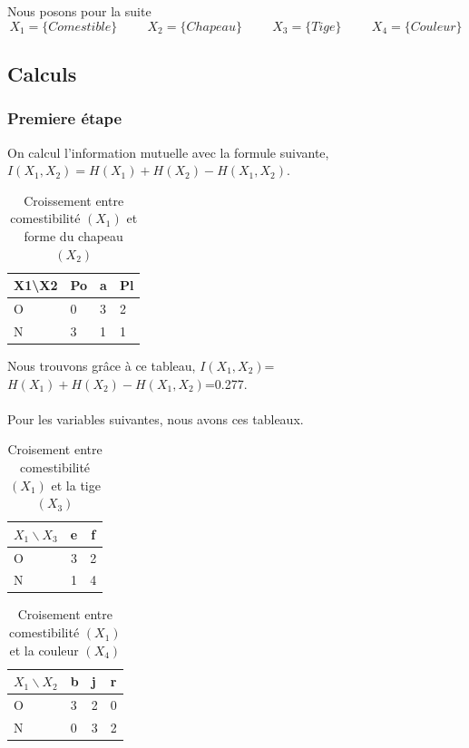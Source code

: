 \documentclass{article}
\begin{document}
Nous posons pour la suite
\[
X_1 = \{Comestible\} \hspace{1cm} X_2 = \{Chapeau\} \hspace{1cm} X_3 = \{Tige\} \hspace{1cm} X_4 = \{Couleur\}
\]

\subsection{Calculs}

\subsubsection{Premiere étape}
On calcul l'information mutuelle avec la formule suivante, $I(X_1,X_2) = H(X_1) + H(X_2) - H(X_1,X_2)$.

\begin{table}[H]
  \centering
    \caption{Croissement entre comestibilité $(X_1)$ et forme du chapeau $(X_2)$}
    \begin{tabular}{|l|l|l|l|}
    \hline
    X1\textbackslash{}X2 & Po & a & Pl \\ \hline
    O                    & 0  & 3 & 2  \\ \hline
    N                    & 3  & 1 & 1  \\ \hline
    \end{tabular}
\end{table}
Nous trouvons grâce à ce tableau, $I(X_1,X_2)$=$H(X_1)+H(X_2)-H(X_1,X_2)$=0.277.
\\\\
Pour les variables suivantes, nous avons ces tableaux.

\begin{table}[H]
  \centering
    \caption{Croisement entre comestibilité $(X_1)$ et la tige $(X_3)$}
    \begin{tabular}{|l|c|c|}
    \hline
    $X_1 \backslash X_3$ & e & f \\ \hline
    O                    & 3  & 2  \\ \hline
    N                    & 1  & 4  \\ \hline
    \end{tabular}
\end{table}

\begin{table}[H]
  \centering
    \caption{Croisement entre comestibilité $(X_1)$ et la couleur $(X_4)$}
    \begin{tabular}{|l|l|l|l|}
      \hline
      $X_1\backslash X_2$ & b & j & r \\ \hline
      O                    & 3  & 2 & 0  \\ \hline
      N                    & 0  & 3 & 2  \\ \hline
      \end{tabular}
\end{table}
\end{document}
